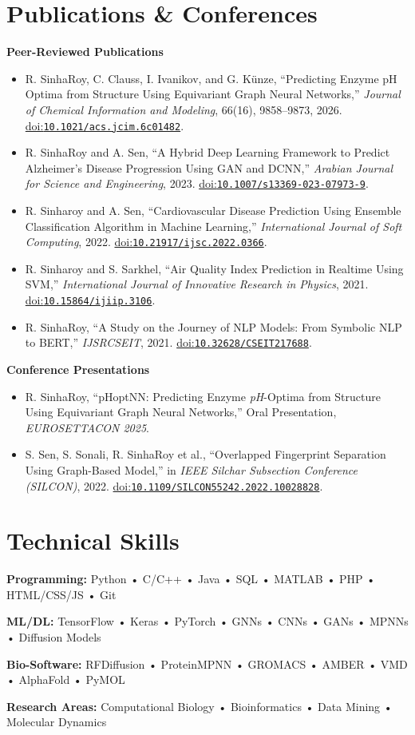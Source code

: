 \documentclass[10pt,a4paper]{article}
\newcommand{\doi}[1]{\href{https://doi.org/#1}{\textcolor{doigray}{doi:\nolinkurl{#1}}}}
\newcommand{\pubhead}[1]{\textbf{#1}\par}
\begin{document}
\section{Publications \& Conferences}
\pubhead{Peer-Reviewed Publications}
\begin{itemize}
  \item R. SinhaRoy, C. Clauss, I. Ivanikov, and G. Künze, “Predicting Enzyme pH Optima from Structure Using Equivariant
        Graph Neural Networks,” \textit{Journal of Chemical Information and Modeling}, 66(16), 9858–9873, 2026.
        \doi{10.1021/acs.jcim.6c01482}.
  \item R. SinhaRoy and A. Sen, “A Hybrid Deep Learning Framework to Predict Alzheimer’s Disease Progression Using
        GAN and DCNN,” \textit{Arabian Journal for Science and Engineering}, 2023. \doi{10.1007/s13369-023-07973-9}.
  \item R. Sinharoy and A. Sen, “Cardiovascular Disease Prediction Using Ensemble Classification Algorithm in Machine
        Learning,” \textit{International Journal of Soft Computing}, 2022. \doi{10.21917/ijsc.2022.0366}.
  \item R. Sinharoy and S. Sarkhel, “Air Quality Index Prediction in Realtime Using SVM,” \textit{International Journal of Innovative
        Research in Physics}, 2021. \doi{10.15864/ijiip.3106}.
  \item R. SinhaRoy, “A Study on the Journey of NLP Models: From Symbolic NLP to BERT,” \textit{IJSRCSEIT}, 2021.
        \doi{10.32628/CSEIT217688}.
\end{itemize}
\vspace{4pt}
\pubhead{Conference Presentations}
\begin{itemize}
  \item R. SinhaRoy, “pHoptNN: Predicting Enzyme \textit{pH}-Optima from Structure Using Equivariant Graph Neural Networks,”
        Oral Presentation, \textit{EUROSETTACON 2025}.
  \item S. Sen, S. Sonali, R. SinhaRoy et al., “Overlapped Fingerprint Separation Using Graph-Based Model,” in \textit{IEEE
        Silchar Subsection Conference (SILCON)}, 2022. \doi{10.1109/SILCON55242.2022.10028828}.
\end{itemize}

\section{Technical Skills}
{\linespread{1.18}\selectfont
\textbf{Programming:} Python • C/C++ • Java • SQL • MATLAB • PHP • HTML/CSS/JS • Git\par
\textbf{ML/DL:} TensorFlow • Keras • PyTorch • GNNs • CNNs • GANs • MPNNs • Diffusion Models\par
\textbf{Bio-Software:} RFDiffusion • ProteinMPNN • GROMACS • AMBER • VMD • AlphaFold • PyMOL\par
\textbf{Research Areas:} Computational Biology • Bioinformatics • Data Mining • Molecular Dynamics\par}
\end{document}
